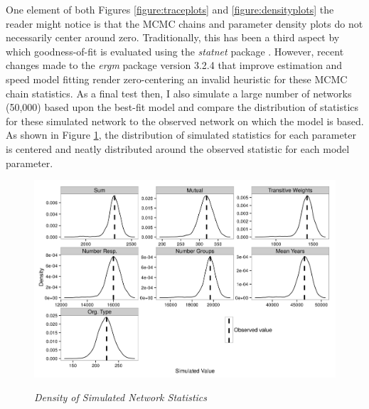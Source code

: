 \documentclass[12pt,a4paper,titlepage]{article}
\begin{document}
One element of both Figures \ref{figure:traceplots} and \ref{figure:densityplots} the reader might notice is that the MCMC chains and parameter density plots do not necessarily center around zero. Traditionally, this has been a third aspect by which goodness-of-fit is evaluated using the \textit{statnet} package \parencite{handcock2014-a}. However, recent changes made to the \textit{ergm} package version 3.2.4 \parencite{handcock2014-a} that improve estimation and speed model fitting render zero-centering an invalid heuristic for these MCMC chain statistics. As a final test then, I also simulate a large number of networks (50,000) based upon the best-fit model and compare the distribution of statistics for these simulated network to the observed network on which the model is based. As shown in Figure \ref{figure:simplots}, the distribution of simulated statistics for each parameter is centered and neatly distributed around the observed statistic for each model parameter.

\begin{figure}[!ht]
\caption{\textit{Density of Simulated Network Statistics}}
\graphicspath{ {`/Users/TScott/Google\space Drive/elwha/PSJ_Submission/Version3'}}
\noindent
\includegraphics[width=6.5in]
{simulationplot}
\label{figure:simplots}
\end{figure}
\end{document}
